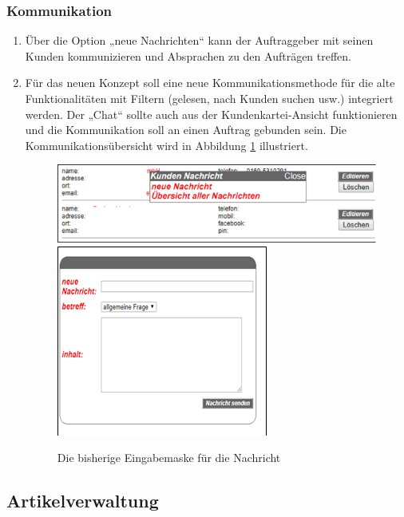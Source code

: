 \subsubsection{Kommunikation}

\begin{enumerate}
	\item Über die Option „neue Nachrichten“ kann der Auftraggeber mit seinen Kunden kommunizieren und Absprachen zu den Aufträgen treffen.
	\item Für das neuen Konzept soll eine neue Kommunikationsmethode für die alte Funktionalitäten mit Filtern (gelesen, nach Kunden suchen usw.) integriert werden. Der „Chat“ sollte auch aus der Kundenkartei-Ansicht funktionieren und die Kommunikation soll an einen Auftrag gebunden sein. 
	Die Kommunikationsübersicht wird in Abbildung \ref{fig:NachrichtErscheint} illustriert. 
	\begin{figure}[h]
		\centering
		\includegraphics[width=0.7\linewidth]{Graphics/newNach.png}
		\includegraphics[width=0.7\linewidth]{Graphics/newNachr.png}
		\caption[Neue Nachricht]{Die bisherige Eingabemaske für die Nachricht}
		\label{fig:NachrichtErscheint}
	\end{figure}

\end{enumerate} 


\subsection{Artikelverwaltung}

